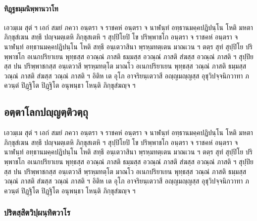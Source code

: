 \documentclass[
]{book}
\begin{document}
\hypertarget{uxe17uxe34uxe0fuxe3auxe10uxe18uxe21uxe3auxe21uxe19uxe34uxe1euxe3auxe1euxe32uxe19uxe27uxe32uxe42uxe17}{%
\paragraph{ทิฏฺฐธมฺมนิพฺพานวาโท}\label{uxe17uxe34uxe0fuxe3auxe10uxe18uxe21uxe3auxe21uxe19uxe34uxe1euxe3auxe1euxe32uxe19uxe27uxe32uxe42uxe17}}

เอวมฺเม สุตํ ฯ เอกํ สมยํ ภควา อนฺตรา จ ราชคหํ อนฺตรา จ นาฬนฺทํ อทฺธานมคฺคปฏิปนฺโน โหติ มหตา ภิกฺขุสํเฆน สทฺธึ ปญฺจมตฺเตหิ ภิกฺขุสเตหิ ฯ สุปฺปิโยปิ โข ปริพฺพาชโก อนฺตรา จ ราชคหํ อนฺตรา จ นาฬนฺทํ อทฺธานมคฺคปฏิปนฺโน โหติ สทฺธึ อนฺเตวาสินา พฺรหฺมทตฺเตน มาณเวน ฯ ตตฺร สุทํ สุปฺปิโย ปริพฺพาชโก อเนกปริยาเยน พุทฺธสฺส อวณฺณํ ภาสติ ธมฺมสฺส อวณฺณํ ภาสติ สํฆสฺส อวณฺณํ ภาสติ ฯ สุปฺปิยสฺส ปน ปริพฺพาชกสฺส อนฺเตวาสี พฺรหฺมทตฺโต มาณโว อเนกปริยาเยน พุทฺธสฺส วณฺณํ ภาสติ ธมฺมสฺส วณฺณํ ภาสติ สํฆสฺส วณฺณํ ภาสติ ฯ อิติห เต อุโภ อาจริยนฺเตวาสี อญฺญมญฺญสฺส อุชุวิปจฺจนิกวาทา ภควนฺตํ ปิฏฺฐิโต ปิฏฺฐิโต อนุพนฺธา โหนฺติ ภิกฺขุสํฆญฺจ ฯ

\hypertarget{uxe2duxe15uxe3auxe15uxe32uxe42uxe25uxe01uxe1buxe0duxe3auxe0duxe15uxe3auxe15uxe34uxe27uxe15uxe3auxe16uxe38}{%
\subsection{อตฺตาโลกปญฺญตฺติวตฺถุ}\label{uxe2duxe15uxe3auxe15uxe32uxe42uxe25uxe01uxe1buxe0duxe3auxe0duxe15uxe3auxe15uxe34uxe27uxe15uxe3auxe16uxe38}}

เอวมฺเม สุตํ ฯ เอกํ สมยํ ภควา อนฺตรา จ ราชคหํ อนฺตรา จ นาฬนฺทํ อทฺธานมคฺคปฏิปนฺโน โหติ มหตา ภิกฺขุสํเฆน สทฺธึ ปญฺจมตฺเตหิ ภิกฺขุสเตหิ ฯ สุปฺปิโยปิ โข ปริพฺพาชโก อนฺตรา จ ราชคหํ อนฺตรา จ นาฬนฺทํ อทฺธานมคฺคปฏิปนฺโน โหติ สทฺธึ อนฺเตวาสินา พฺรหฺมทตฺเตน มาณเวน ฯ ตตฺร สุทํ สุปฺปิโย ปริพฺพาชโก อเนกปริยาเยน พุทฺธสฺส อวณฺณํ ภาสติ ธมฺมสฺส อวณฺณํ ภาสติ สํฆสฺส อวณฺณํ ภาสติ ฯ สุปฺปิยสฺส ปน ปริพฺพาชกสฺส อนฺเตวาสี พฺรหฺมทตฺโต มาณโว อเนกปริยาเยน พุทฺธสฺส วณฺณํ ภาสติ ธมฺมสฺส วณฺณํ ภาสติ สํฆสฺส วณฺณํ ภาสติ ฯ อิติห เต อุโภ อาจริยนฺเตวาสี อญฺญมญฺญสฺส อุชุวิปจฺจนิกวาทา ภควนฺตํ ปิฏฺฐิโต ปิฏฺฐิโต อนุพนฺธา โหนฺติ ภิกฺขุสํฆญฺจ ฯ

\hypertarget{uxe1buxe23uxe34uxe15uxe2auxe3auxe2auxe34uxe15uxe27uxe34uxe1buxe3auxe1cuxe19uxe3auxe17uxe34uxe15uxe27uxe32uxe42uxe23}{%
\subsubsection{ปริตสฺสิตวิปฺผนฺทิตวาโร}\label{uxe1buxe23uxe34uxe15uxe2auxe3auxe2auxe34uxe15uxe27uxe34uxe1buxe3auxe1cuxe19uxe3auxe17uxe34uxe15uxe27uxe32uxe42uxe23}}
\end{document}
